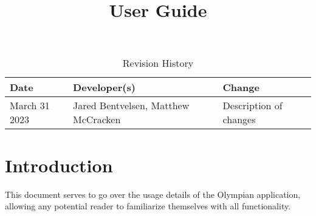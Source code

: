 \documentclass{article}
\title{User Guide\\\progname}
\author{\authname}
\date{}
\begin{document}
\begin{table}[hp]
\caption{Revision History} \label{TblRevisionHistory}
\begin{tabularx}{\textwidth}{llX}
\toprule
\textbf{Date} & \textbf{Developer(s)} & \textbf{Change}\\
\midrule
March 31 2023 & Jared Bentvelsen, Matthew McCracken & Description of changes\\
\bottomrule
\end{tabularx}
\end{table}

\newpage

\maketitle

\tableofcontents

\section{Introduction}

This document serves to go over the usage details of the Olympian application, allowing any potential reader to familiarize themselves with all functionality.
\end{document}
